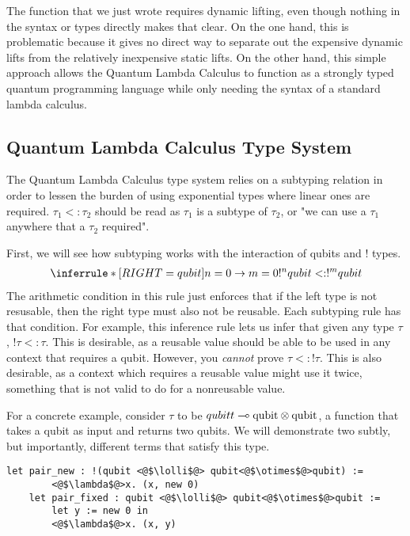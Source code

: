The function that we just wrote requires dynamic lifting, even though nothing in the syntax or types directly makes that clear.
On the one hand, this is problematic because it gives no direct way to separate out the expensive dynamic lifts from the relatively inexpensive static lifts.
On the other hand, this simple approach allows the Quantum Lambda Calculus to function as a strongly typed quantum programming language while only needing the syntax of a standard lambda calculus.


\subsection{Quantum Lambda Calculus Type System}
The Quantum Lambda Calculus type system relies on a subtyping relation in order to lessen the burden of using exponential types where linear ones are required.
$\tau_1 <: \tau_2$ should be read as $\tau_1$ is a subtype of $\tau_2$, or "we can use a $\tau_1$ anywhere that a $\tau_2$ required".

First, we will see how subtyping works with the interaction of qubits and $!$ types.
\begin{align*}
    \inferrule*[RIGHT=qubit]{n = 0 \rightarrow m = 0}{!^nqubit <: !^m qubit}
\end{align*}
The arithmetic condition in this rule just enforces that if the left type is not resusable, then the right type must also not be reusable.
Each subtyping rule has that condition.
For example, this inference rule lets us infer that given any type $\tau$, $!\tau <:\tau$. 
This is desirable, as a reusable value should be able to be used in any context that requires a qubit.
However, you \textit{cannot} prove $\tau <: !\tau$.
This is also desirable, as a context which requires a reusable value might use it twice, something that is not valid to do for a nonreusable value.

For a concrete example, consider $\tau$ to be $qubitt\multimap \text{qubit}\otimes\text{qubit}$, a function that takes a qubit as input and returns two qubits.
We will demonstrate two subtly, but importantly, different terms that satisfy this type.

\begin{lstlisting}[style=customcoq]
    let pair_new : !(qubit <@$\lolli$@> qubit<@$\otimes$@>qubit) :=
        <@$\lambda$@>x. (x, new 0)
    let pair_fixed : qubit <@$\lolli$@> qubit<@$\otimes$@>qubit :=
        let y := new 0 in
        <@$\lambda$@>x. (x, y)
\end{lstlisting}

